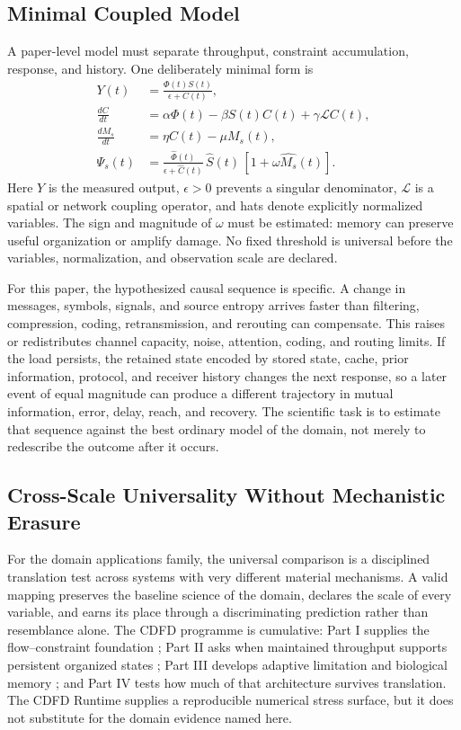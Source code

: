 \documentclass[12pt,a4paper]{article}
\begin{document}
\subsection{Minimal Coupled Model}

A paper-level model must separate throughput, constraint accumulation, response,
and history. One deliberately minimal form is
\begin{align}
Y(t) &= \frac{\Phi(t)S(t)}{\epsilon + C(t)}, \\
\frac{dC}{dt} &= \alpha \Phi(t) - \beta S(t)C(t) + \gamma \mathcal{L}C(t), \\
\frac{dM_s}{dt} &= \eta C(t) - \mu M_s(t), \\
\Psi_s(t) &= \frac{\widehat{\Phi}(t)}{\epsilon+\widehat{C}(t)}\,
             \widehat{S}(t)\,[1+\omega\widehat{M_s}(t)] .
\end{align}
Here $Y$ is the measured output, $\epsilon>0$ prevents a singular denominator,
$\mathcal{L}$ is a spatial or network coupling operator, and hats denote
explicitly normalized variables. The sign and magnitude of $\omega$ must be
estimated: memory can preserve useful organization or amplify damage. No fixed
threshold is universal before the variables, normalization, and observation
scale are declared.

For this paper, the hypothesized causal sequence is specific. A change in
messages, symbols, signals, and source entropy arrives faster than filtering, compression, coding, retransmission, and rerouting can compensate.
This raises or redistributes channel capacity, noise, attention, coding, and routing limits. If the load persists,
the retained state encoded by stored state, cache, prior information, protocol, and receiver history changes the next response, so a later event of equal
magnitude can produce a different trajectory in mutual information, error, delay, reach, and recovery. The
scientific task is to estimate that sequence against the best ordinary model of
the domain, not merely to redescribe the outcome after it occurs.

\subsection{Cross-Scale Universality Without Mechanistic Erasure}

For the domain applications family, the universal comparison is a disciplined translation test across systems with very different material mechanisms. A valid mapping preserves the baseline science of the domain, declares the scale of every variable, and earns its place through a discriminating prediction rather than resemblance alone. \cite{Holling1973,Turing1952,Shannon1948,BakTangWiesenfeld1987}
The CDFD programme is cumulative: Part I supplies the flow--constraint
foundation \cite{MujjabiPartI2026}; Part II asks when maintained throughput
supports persistent organized states \cite{MujjabiPartII2026}; Part III
develops adaptive limitation and biological memory \cite{MujjabiPartIII2026};
and Part IV \cite{MujjabiPartIV2026} tests how much of that architecture
survives translation. The CDFD Runtime \cite{CDFDRuntime2026} supplies a
reproducible numerical stress surface, but it does not substitute for the
domain evidence named here.
\end{document}
